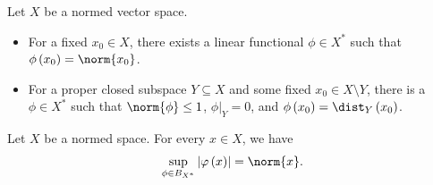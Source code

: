 \begin{theorem}\label{thm:hb_separation}
  Let $X$ be a normed vector space.
  \begin{itemize}
    \item For a fixed $x_0\in X$, there exists a linear functional $\phi\in X^{\ast}$ such that $\phi\left(x_0\right) = \norm{x_0}$.
    \item For a proper closed subspace $Y\subseteq X$ and some fixed $x_0\in X\setminus Y$, there is a $\phi\in X^{\ast}$ such that $\norm{\phi} \leq 1$, $\phi|_{Y} = 0$, and $\phi\left(x_0\right) = \dist_{Y}\left(x_0\right)$.
  \end{itemize}
\end{theorem}
\begin{corollary}
  Let $X$ be a normed space. For every $x\in X$, we have
  \begin{align*}
    \sup_{\phi\in B_{X^{\ast}}}\left\vert \varphi\left(x\right)  \right\vert = \norm{x}.
  \end{align*}
\end{corollary}
